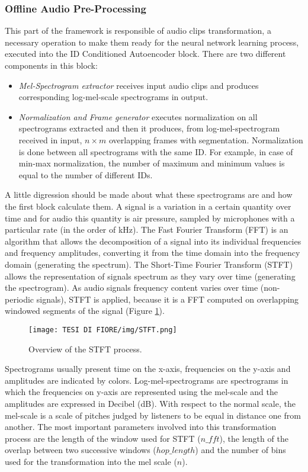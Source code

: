 \subsubsection{Offline Audio Pre-Processing}
This part of the framework is responsible of audio clips transformation, a necessary operation to make them ready for the neural network learning process, executed into the ID Conditioned Autoencoder block. There are two different components in this block:
\begin{itemize}
    \item {\textit{Mel-Spectrogram extractor} receives input audio clips and produces corresponding log-mel-scale spectrograms in output.}
    \item {\textit{Normalization and Frame generator} executes normalization on all spectrograms extracted and then it produces, from log-mel-spectrogram received in input, $n \times m$ overlapping frames with segmentation. Normalization is done between all spectrograms with the same ID. For example, in case of min-max normalization, the number of maximum and minimum values is equal to the number of different IDs. }
\end{itemize}
A little digression should be made about what these spectrograms are and how the first block calculate them. A signal is a variation in a certain quantity over time and for audio this quantity is air pressure, sampled by microphones with a particular rate (in the order of kHz). The Fast Fourier Transform (FFT) is an algorithm that allows the decomposition of a signal into its individual frequencies and frequency amplitudes, converting it from the time domain into the frequency domain (generating the spectrum). The Short-Time Fourier Transform (STFT) allows the representation of signals spectrum as they vary over time (generating the spectrogram). As audio signals frequency content varies over time (non-periodic signals), STFT is applied, because it is a FFT computed on overlapping windowed segments of the signal (Figure \ref{sftf}).\\
\begin{figure}[ht]
\texttt{[image: TESI DI FIORE/img/STFT.png]}
\centering
\caption{Overview of the STFT process.}
\label{sftf}
\end{figure}
Spectrograms usually present time on the x-axis, frequencies on the y-axis and amplitudes are indicated by colors. Log-mel-spectrograms are spectrograms in which the frequencies on y-axis are represented using the mel-scale and the amplitudes are expressed in Decibel (dB). With respect to the normal scale, the mel-scale is a scale of pitches judged by listeners to be equal in distance one from another. The most important parameters involved into this transformation process are the length of the window used for STFT ($n\_fft$), the length of the overlap between two successive windows ($hop\_length$) and the number of bins used for the transformation into the mel scale ($n$).
